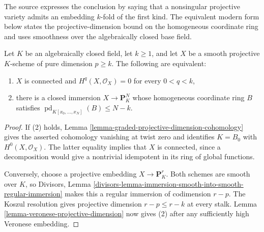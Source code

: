 \begin{lemma}
\label{lemma-smooth-projective-coordinate-ring-projective-dimension}
\begin{reference}
\cite[Chapter III, \S 5, no. 77, final Corollary, p. 273]{FAC}
\end{reference}
\begin{history}
The source expresses the conclusion by saying that a nonsingular projective
variety admits an embedding $k$-fold of the first kind. The equivalent modern
form below states the projective-dimension bound on the homogeneous coordinate
ring and uses smoothness over the algebraically closed base field.
\end{history}
Let $K$ be an algebraically closed field, let $k\geq1$, and let $X$ be a
smooth projective $K$-scheme of pure dimension $p\geq k$. The following are
equivalent:
\begin{enumerate}
\item $X$ is connected and $H^q(X,\mathcal O_X)=0$ for every $0<q<k$,
\item there is a closed immersion $X\to\mathbf P^N_K$ whose homogeneous
coordinate ring $B$ satisfies
$\operatorname{pd}_{K[x_0,\ldots,x_N]}(B)\leq N-k$.
\end{enumerate}
\end{lemma}

\begin{proof}
If (2) holds, Lemma \ref{lemma-graded-projective-dimension-cohomology}
gives the asserted cohomology vanishing at twist zero and identifies
$K=B_0$ with $H^0(X,\mathcal O_X)$. The latter equality implies that $X$
is connected, since a decomposition would give a nontrivial idempotent in
its ring of global functions.

Conversely, choose a projective embedding $X\to\mathbf P^r_K$. Both schemes
are smooth over $K$, so Divisors, Lemma
\ref{divisors-lemma-immersion-smooth-into-smooth-regular-immersion} makes
this a regular immersion of codimension $r-p$. The Koszul resolution gives
projective dimension $r-p\leq r-k$ at every stalk. Lemma
\ref{lemma-veronese-projective-dimension} now gives (2) after any
sufficiently high Veronese embedding.
\end{proof}

